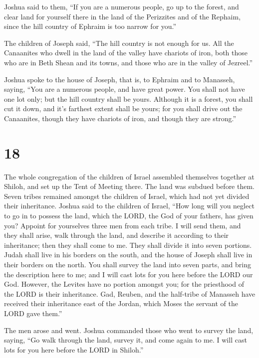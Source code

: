  Joshua said to them, ``If you are a numerous people, go up
to the forest, and clear land for yourself there in the land of the
Perizzites and of the Rephaim, since the hill country of Ephraim is too
narrow for you.''

 The children of Joseph said, ``The hill country is not
enough for us. All the Canaanites who dwell in the land of the valley
have chariots of iron, both those who are in Beth Shean and its towns,
and those who are in the valley of Jezreel.''

 Joshua spoke to the house of Joseph, that is, to Ephraim
and to Manasseh, saying, ``You are a numerous people, and have great
power. You shall not have one lot only;  but the hill
country shall be yours. Although it is a forest, you shall cut it down,
and it's farthest extent shall be yours; for you shall drive out the
Canaanites, though they have chariots of iron, and though they are
strong.''

\hypertarget{section-17}{%
\section{18}\label{section-17}}

 The whole congregation of the children of Israel assembled
themselves together at Shiloh, and set up the Tent of Meeting there. The
land was subdued before them.  Seven tribes remained amongst
the children of Israel, which had not yet divided their inheritance.
 Joshua said to the children of Israel, ``How long will you
neglect to go in to possess the land, which the LORD, the God of your
fathers, has given you?  Appoint for yourselves three men
from each tribe. I will send them, and they shall arise, walk through
the land, and describe it according to their inheritance; then they
shall come to me.  They shall divide it into seven portions.
Judah shall live in his borders on the south, and the house of Joseph
shall live in their borders on the north.  You shall survey
the land into seven parts, and bring the description here to me; and I
will cast lots for you here before the LORD our God. 
However, the Levites have no portion amongst you; for the priesthood of
the LORD is their inheritance. Gad, Reuben, and the half-tribe of
Manasseh have received their inheritance east of the Jordan, which Moses
the servant of the LORD gave them.''

 The men arose and went. Joshua commanded those who went to
survey the land, saying, ``Go walk through the land, survey it, and come
again to me. I will cast lots for you here before the LORD in Shiloh.''

